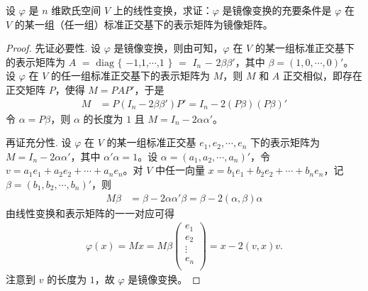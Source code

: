 \documentclass[../../main.tex]{subfiles}%
\begin{document}
\begin{proposition}\label{proposition:例9.41}
设 \(\varphi\) 是 \(n\) 维欧氏空间 \(V\) 上的线性变换，求证：\(\varphi\) 是镜像变换的充要条件是 \(\varphi\) 在 \(V\) 的某一组（任一组）标准正交基下的表示矩阵为镜像矩阵。
\end{proposition}
\begin{proof}

先证必要性. 设 \(\varphi\) 是镜像变换，则由可知，\(\varphi\) 在 \(V\) 的某一组标准正交基下的表示矩阵为 $A$ $=$ $\mathrm{diag}$ $\{$ $-1$,$1$,$\cdots$,$1$ $\}$ $=$ $I_n$ $-$ $2\beta\beta'$，其中 \(\beta = (1,0,\cdots,0)'\)。设 \(\varphi\) 在 \(V\) 的任一组标准正交基下的表示矩阵为 \(M\)，则 \(M\) 和 \(A\) 正交相似，即存在正交矩阵 \(P\)，使得 \(M = PAP'\)，于是
\begin{align*}
M &= P(I_n - 2\beta\beta')P' = I_n - 2(P\beta)(P\beta)'
\end{align*}
令 \(\alpha = P\beta\)，则 \(\alpha\) 的长度为 \(1\) 且 \(M = I_n - 2\alpha\alpha'\)。

再证充分性. 设 \(\varphi\) 在 \(V\) 的某一组标准正交基 \(e_1,e_2,\cdots,e_n\) 下的表示矩阵为 \(M = I_n - 2\alpha\alpha'\)，其中 \(\alpha'\alpha = 1\)。设 \(\alpha = (a_1,a_2,\cdots,a_n)'\)，令 \(v = a_1e_1 + a_2e_2 + \cdots + a_ne_n\)。对 \(V\) 中任一向量 \(x = b_1e_1 + b_2e_2 + \cdots + b_ne_n\)，记 \(\beta = (b_1,b_2,\cdots,b_n)'\)，则
\begin{align*}
M\beta &= \beta - 2\alpha\alpha'\beta = \beta - 2(\alpha,\beta)\alpha
\end{align*}
由线性变换和表示矩阵的一一对应可得
\begin{align*}
\varphi (x)=Mx=M\beta \left( \begin{array}{c}
e_1\\
e_2\\
\vdots\\
e_n\\
\end{array} \right) =x-2(v,x)v.
\end{align*}
注意到 \(v\) 的长度为 \(1\)，故 \(\varphi\) 是镜像变换。

\end{proof}
\end{document}
